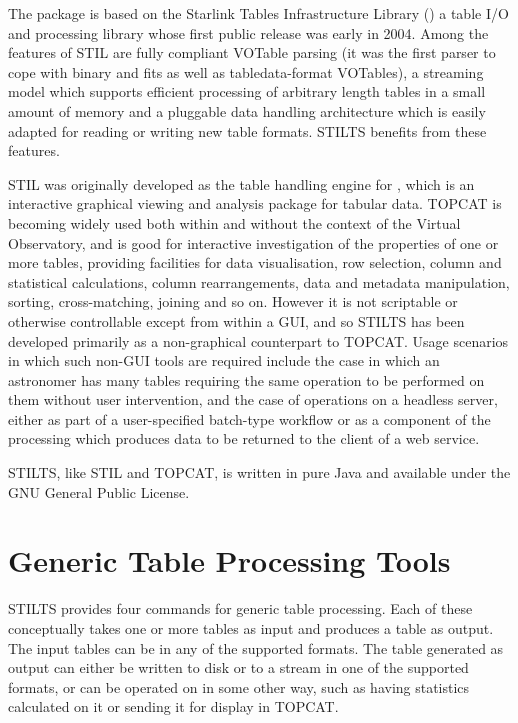 \documentclass[11pt,twoside]{article}  %
\begin{document}
The package is based on the Starlink Tables Infrastructure Library 
()
a table I/O and processing library whose first public release was
early in 2004.  Among the features of STIL are fully compliant 
VOTable parsing (it was the first parser to cope with 
{\sc binary} and {\sc fits} as well
as {\sc tabledata}-format VOTables),
a streaming model which supports efficient 
processing of arbitrary length tables
in a small amount of memory
and a pluggable data handling architecture which is easily adapted for 
reading or writing new table formats.
STILTS benefits from these features.

STIL was originally developed as the table handling engine for
,
which is an interactive graphical viewing and analysis package
for tabular data.  TOPCAT is becoming widely used both within
and without the context of the Virtual Observatory, and is
good for interactive investigation of the properties of
one or more tables, providing facilities for data visualisation, 
row selection, column and statistical calculations, 
column rearrangements, data and metadata 
manipulation, sorting, cross-matching, joining and so on.
However it is not scriptable or otherwise controllable except 
from within a GUI, and so STILTS has been developed primarily 
as a non-graphical counterpart to TOPCAT.  
Usage scenarios in which such non-GUI tools are required include
the case in which an astronomer has many tables requiring the same
operation to be performed on them without user intervention,
and the case of operations on a headless server, either as part of
a user-specified batch-type workflow or as a component of the
processing which produces data to be returned to
the client of a web service.

STILTS, like STIL and TOPCAT, is written in pure Java and available
under the GNU General Public License.

\section{Generic Table Processing Tools}

STILTS provides four commands for generic table processing.
Each of these conceptually takes one or more tables as input and
produces a table as output.
The input tables can be in any of the supported formats.
The table generated as output can either be written to disk or 
to a stream in one of the supported formats, or 
can be operated on in some other way, such as having statistics
calculated on it or sending it for display in TOPCAT.
\end{document}
